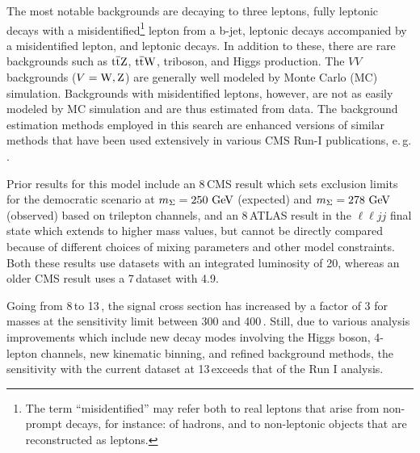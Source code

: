 The most notable backgrounds are \WZ decaying to three leptons, fully leptonic \ttbar decays with a misidentified\footnote{The term ``misidentified'' may refer both to real leptons that arise from non-prompt decays, for instance: of hadrons, and to non-leptonic objects that are reconstructed as leptons.} lepton from a b-jet, leptonic \Z decays accompanied by a misidentified lepton, and leptonic \ZZ decays. In addition to these, there are rare backgrounds such as $\mathrm{t}\overline{\mathrm{t}}\mathrm{Z}$, $\mathrm{t}\overline{\mathrm{t}}\mathrm{W}$, triboson, and Higgs production.
The $VV$ backgrounds ($V = \mathrm{W}, \mathrm{Z}$) are generally well modeled by Monte Carlo (MC) simulation. Backgrounds with misidentified leptons, however, are not as easily modeled by MC simulation and are thus estimated from data. The background estimation methods employed in this search are enhanced versions of similar methods that have been used extensively in various CMS Run-I publications, e.\,g. \cite{Chatrchyan:2013xsw,Chatrchyan:2014aea,Khachatryan:2014mma,Khachatryan:2014jya}.

Prior results for this model include an 8\,\TeV CMS result \cite{CMS-PAS-EXO-14-001} which sets exclusion limits for the democratic scenario at $m_\Sigma = 250\,\,\text{Ge\hspace{-.08em}V}$ (expected) and $m_\Sigma = 278\,\,\text{Ge\hspace{-.08em}V}$ (observed) based on trilepton channels, and an 8\,\TeV ATLAS result in the $\ell\ell jj$ final state \cite{ATLAS-CERN-PH-EP-2015-094} which extends to higher mass values, but cannot be directly compared because of different choices of mixing parameters and other model constraints. Both these results use datasets with an integrated luminosity of 20\fbinv, whereas an older CMS result uses a 7\,\TeV dataset with 4.9\fbinv \cite{CMS-PAPER-EXO-11-073}.

Going from 8\,\TeV to 13\,\TeV, the signal cross section has increased by a factor of 3 for masses at the sensitivity limit between 300 and 400\,\GeV. Still, due to various analysis improvements which include new decay modes involving the Higgs boson, 4-lepton channels, new kinematic binning, and refined background methods, the sensitivity with the current \fullLumi dataset at 13\,\TeV exceeds that of the Run I analysis.


